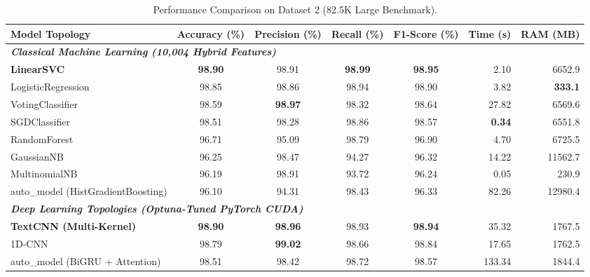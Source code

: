 \documentclass[conference]{IEEEtran}
\begin{document}
\begin{table}[!t]
\caption{Performance Comparison on Dataset 2 (82.5K Large Benchmark).}
\label{tab:d2_results}
\centering\small
\begin{tabularx}{\textwidth}{@{}l c c c c r r@{}}
\toprule
\textbf{Model Topology} & \textbf{Accuracy (\%)} & \textbf{Precision (\%)} & \textbf{Recall (\%)} & \textbf{F1-Score (\%)} & \textbf{Time (s)} & \textbf{RAM (MB)} \\
\midrule
\multicolumn{7}{l}{\textit{\textbf{Classical Machine Learning (10,004 Hybrid Features)}}} \\
\textbf{LinearSVC}                          & \textbf{98.90} & 98.91          & \textbf{98.99} & \textbf{98.95} & 2.10  & 6652.9   \\
LogisticRegression                          & 98.85          & 98.86          & 98.94          & 98.90          & 3.82  & \textbf{333.1}    \\
VotingClassifier                            & 98.59          & \textbf{98.97} & 98.32          & 98.64          & 27.82 & 6569.6   \\
SGDClassifier                               & 98.51          & 98.28          & 98.86          & 98.57          & \textbf{0.34}  & 6551.8   \\
RandomForest                                & 96.71          & 95.09          & 98.79          & 96.90          & 4.70  & 6725.5   \\
GaussianNB                                  & 96.25          & 98.47          & 94.27          & 96.32          & 14.22 & 11562.7  \\
MultinomialNB                               & 96.19          & 98.91          & 93.72          & 96.24          & 0.05  & 230.9    \\
auto\_model (HistGradientBoosting)          & 96.10          & 94.31          & 98.43          & 96.33          & 82.26 & 12980.4  \\
\midrule
\multicolumn{7}{l}{\textit{\textbf{Deep Learning Topologies (Optuna-Tuned PyTorch CUDA)}}} \\
\textbf{TextCNN (Multi-Kernel)}             & \textbf{98.90} & \textbf{98.96} & 98.93          & \textbf{98.94} & 35.32          & 1767.5   \\
1D-CNN                                      & 98.79          & \textbf{99.02} & 98.66          & 98.84          & 17.65          & 1762.5   \\
auto\_model (BiGRU + Attention)             & 98.51          & 98.42          & 98.72          & 98.57          & 133.34         & 1844.4   \\

\end{tabularx}
\end{table}
\end{document}

